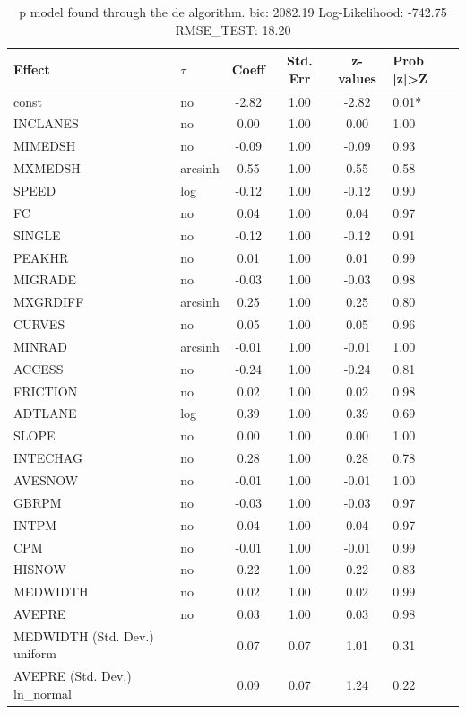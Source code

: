 \begin{table}
	\caption{p model found through the de algorithm. bic: 2082.19 Log-Likelihood: -742.75 RMSE_TEST: 18.20}
	\begin{center}
		\begin{tabular}{|l|l|c|c|c|l|}
			\hline
			Effect & $\tau$ & Coeff & Std. Err & z-values & Prob |z|>Z \\
			\hline
			const & no & -2.82 & 1.00 & -2.82 & 0.01* \\
			\hline
			INCLANES & no & 0.00 & 1.00 & 0.00 & 1.00 \\
			\hline
			MIMEDSH & no & -0.09 & 1.00 & -0.09 & 0.93 \\
			\hline
			MXMEDSH & arcsinh & 0.55 & 1.00 & 0.55 & 0.58 \\
			\hline
			SPEED & log & -0.12 & 1.00 & -0.12 & 0.90 \\
			\hline
			FC & no & 0.04 & 1.00 & 0.04 & 0.97 \\
			\hline
			SINGLE & no & -0.12 & 1.00 & -0.12 & 0.91 \\
			\hline
			PEAKHR & no & 0.01 & 1.00 & 0.01 & 0.99 \\
			\hline
			MIGRADE & no & -0.03 & 1.00 & -0.03 & 0.98 \\
			\hline
			MXGRDIFF & arcsinh & 0.25 & 1.00 & 0.25 & 0.80 \\
			\hline
			CURVES & no & 0.05 & 1.00 & 0.05 & 0.96 \\
			\hline
			MINRAD & arcsinh & -0.01 & 1.00 & -0.01 & 1.00 \\
			\hline
			ACCESS & no & -0.24 & 1.00 & -0.24 & 0.81 \\
			\hline
			FRICTION & no & 0.02 & 1.00 & 0.02 & 0.98 \\
			\hline
			ADTLANE & log & 0.39 & 1.00 & 0.39 & 0.69 \\
			\hline
			SLOPE & no & 0.00 & 1.00 & 0.00 & 1.00 \\
			\hline
			INTECHAG & no & 0.28 & 1.00 & 0.28 & 0.78 \\
			\hline
			AVESNOW & no & -0.01 & 1.00 & -0.01 & 1.00 \\
			\hline
			GBRPM & no & -0.03 & 1.00 & -0.03 & 0.97 \\
			\hline
			INTPM & no & 0.04 & 1.00 & 0.04 & 0.97 \\
			\hline
			CPM & no & -0.01 & 1.00 & -0.01 & 0.99 \\
			\hline
			HISNOW & no & 0.22 & 1.00 & 0.22 & 0.83 \\
			\hline
			MEDWIDTH & no & 0.02 & 1.00 & 0.02 & 0.99 \\
			\hline
			AVEPRE & no & 0.03 & 1.00 & 0.03 & 0.98 \\
			\hline
			MEDWIDTH (Std. Dev.) uniform &  & 0.07 & 0.07 & 1.01 & 0.31 \\
			\hline
			AVEPRE (Std. Dev.) ln_normal &  & 0.09 & 0.07 & 1.24 & 0.22 \\
			\hline
		\end{tabular}
	\end{center}
\end{table}
